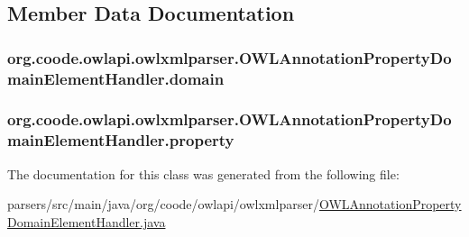 \subsection{Member Data Documentation}
\hypertarget{classorg_1_1coode_1_1owlapi_1_1owlxmlparser_1_1_o_w_l_annotation_property_domain_element_handler_ae94dbcbd9f84197de53f369e4f9858cb}{
\subsubsection[{domain}]{ org.\-coode.\-owlapi.\-owlxmlparser.\-O\-W\-L\-Annotation\-Property\-Domain\-Element\-Handler.\-domain\hspace{0.3cm}{\ttfamily [private]}}}\label{classorg_1_1coode_1_1owlapi_1_1owlxmlparser_1_1_o_w_l_annotation_property_domain_element_handler_ae94dbcbd9f84197de53f369e4f9858cb}
\hypertarget{classorg_1_1coode_1_1owlapi_1_1owlxmlparser_1_1_o_w_l_annotation_property_domain_element_handler_a4e098b2e55a727961eef8088c28d87da}{
\subsubsection[{property}]{ org.\-coode.\-owlapi.\-owlxmlparser.\-O\-W\-L\-Annotation\-Property\-Domain\-Element\-Handler.\-property\hspace{0.3cm}{\ttfamily [private]}}}\label{classorg_1_1coode_1_1owlapi_1_1owlxmlparser_1_1_o_w_l_annotation_property_domain_element_handler_a4e098b2e55a727961eef8088c28d87da}


The documentation for this class was generated from the following file\-:\begin{DoxyCompactItemize}
\item 
parsers/src/main/java/org/coode/owlapi/owlxmlparser/\hyperlink{_o_w_l_annotation_property_domain_element_handler_8java}{O\-W\-L\-Annotation\-Property\-Domain\-Element\-Handler.\-java}\end{DoxyCompactItemize}
